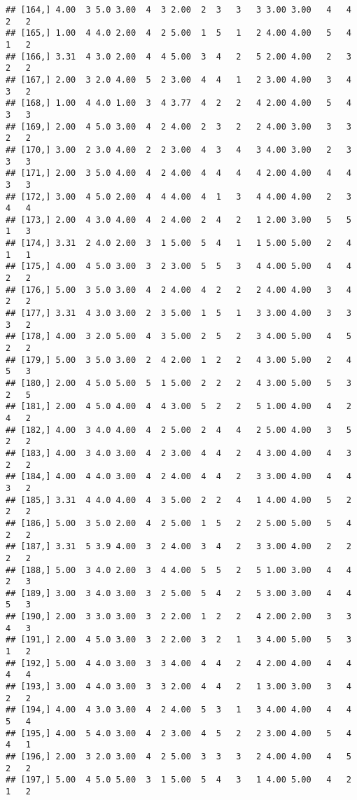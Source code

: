 \documentclass[]{article}
\begin{document}
\begin{verbatim}
## [164,] 4.00  3 5.0 3.00  4  3 2.00  2  3   3   3 3.00 3.00   4   4   2   2
## [165,] 1.00  4 4.0 2.00  4  2 5.00  1  5   1   2 4.00 4.00   5   4   1   2
## [166,] 3.31  4 3.0 2.00  4  4 5.00  3  4   2   5 2.00 4.00   2   3   2   2
## [167,] 2.00  3 2.0 4.00  5  2 3.00  4  4   1   2 3.00 4.00   3   4   3   2
## [168,] 1.00  4 4.0 1.00  3  4 3.77  4  2   2   4 2.00 4.00   5   4   3   3
## [169,] 2.00  4 5.0 3.00  4  2 4.00  2  3   2   2 4.00 3.00   3   3   2   2
## [170,] 3.00  2 3.0 4.00  2  2 3.00  4  3   4   3 4.00 3.00   2   3   3   3
## [171,] 2.00  3 5.0 4.00  4  2 4.00  4  4   4   4 2.00 4.00   4   4   3   3
## [172,] 3.00  4 5.0 2.00  4  4 4.00  4  1   3   4 4.00 4.00   2   3   4   4
## [173,] 2.00  4 3.0 4.00  4  2 4.00  2  4   2   1 2.00 3.00   5   5   1   3
## [174,] 3.31  2 4.0 2.00  3  1 5.00  5  4   1   1 5.00 5.00   2   4   1   1
## [175,] 4.00  4 5.0 3.00  3  2 3.00  5  5   3   4 4.00 5.00   4   4   2   2
## [176,] 5.00  3 5.0 3.00  4  2 4.00  4  2   2   2 4.00 4.00   3   4   2   2
## [177,] 3.31  4 3.0 3.00  2  3 5.00  1  5   1   3 3.00 4.00   3   3   3   2
## [178,] 4.00  3 2.0 5.00  4  3 5.00  2  5   2   3 4.00 5.00   4   5   2   2
## [179,] 5.00  3 5.0 3.00  2  4 2.00  1  2   2   4 3.00 5.00   2   4   5   3
## [180,] 2.00  4 5.0 5.00  5  1 5.00  2  2   2   4 3.00 5.00   5   3   2   5
## [181,] 2.00  4 5.0 4.00  4  4 3.00  5  2   2   5 1.00 4.00   4   2   4   2
## [182,] 4.00  3 4.0 4.00  4  2 5.00  2  4   4   2 5.00 4.00   3   5   2   2
## [183,] 4.00  3 4.0 3.00  4  2 3.00  4  4   2   4 3.00 4.00   4   3   2   2
## [184,] 4.00  4 4.0 3.00  4  2 4.00  4  4   2   3 3.00 4.00   4   4   3   2
## [185,] 3.31  4 4.0 4.00  4  3 5.00  2  2   4   1 4.00 4.00   5   2   2   2
## [186,] 5.00  3 5.0 2.00  4  2 5.00  1  5   2   2 5.00 5.00   5   4   2   2
## [187,] 3.31  5 3.9 4.00  3  2 4.00  3  4   2   3 3.00 4.00   2   2   2   2
## [188,] 5.00  3 4.0 2.00  3  4 4.00  5  5   2   5 1.00 3.00   4   4   2   3
## [189,] 3.00  3 4.0 3.00  3  2 5.00  5  4   2   5 3.00 3.00   4   4   5   3
## [190,] 2.00  3 3.0 3.00  3  2 2.00  1  2   2   4 2.00 2.00   3   3   4   3
## [191,] 2.00  4 5.0 3.00  3  2 2.00  3  2   1   3 4.00 5.00   5   3   1   2
## [192,] 5.00  4 4.0 3.00  3  3 4.00  4  4   2   4 2.00 4.00   4   4   4   4
## [193,] 3.00  4 4.0 3.00  3  3 2.00  4  4   2   1 3.00 3.00   3   4   2   2
## [194,] 4.00  4 3.0 3.00  4  2 4.00  5  3   1   3 4.00 4.00   4   4   5   4
## [195,] 4.00  5 4.0 3.00  4  2 3.00  4  5   2   2 3.00 4.00   5   4   4   1
## [196,] 2.00  3 2.0 3.00  4  2 5.00  3  3   3   2 4.00 4.00   4   5   2   2
## [197,] 5.00  4 5.0 5.00  3  1 5.00  5  4   3   1 4.00 5.00   4   2   1   2

\end{verbatim}
\end{document}
